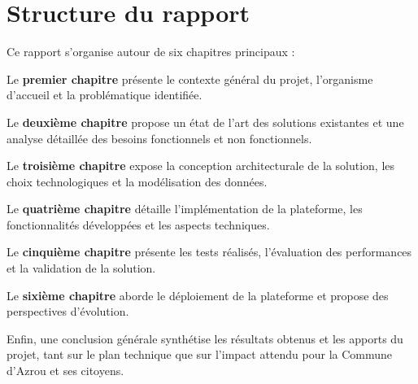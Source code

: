 \section*{Structure du rapport}

Ce rapport s'organise autour de six chapitres principaux :

Le \textbf{premier chapitre} présente le contexte général du projet, l'organisme d'accueil et la problématique identifiée.

Le \textbf{deuxième chapitre} propose un état de l'art des solutions existantes et une analyse détaillée des besoins fonctionnels et non fonctionnels.

Le \textbf{troisième chapitre} expose la conception architecturale de la solution, les choix technologiques et la modélisation des données.

Le \textbf{quatrième chapitre} détaille l'implémentation de la plateforme, les fonctionnalités développées et les aspects techniques.

Le \textbf{cinquième chapitre} présente les tests réalisés, l'évaluation des performances et la validation de la solution.

Le \textbf{sixième chapitre} aborde le déploiement de la plateforme et propose des perspectives d'évolution.

Enfin, une conclusion générale synthétise les résultats obtenus et les apports du projet, tant sur le plan technique que sur l'impact attendu pour la Commune d'Azrou et ses citoyens.
